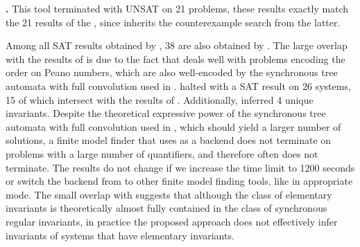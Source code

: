 \textbf{\ringenSync{}.} This tool terminated with UNSAT on 21 problems, these results exactly match the 21 results of the \ringen{\cvc{}}, since \ringenSync{} inherits the counterexample search from the latter.

Among all SAT results obtained by \eldarica{}, 38 are also obtained by \ringenSync{}.
The large overlap with the results of \eldarica{} is due to the fact that \eldarica{} deals well with problems encoding the order on Peano numbers, which are also well-encoded by the synchronous tree automata with full convolution used in \ringenSync{}. \racer{} halted with a SAT result on 26 systems, 15 of which intersect with the results of \ringenSync{}. Additionally, \ringenSync{} inferred 4 unique invariants. Despite the theoretical expressive power of the synchronous tree automata with full convolution used in \ringenSync{}, which should yield a larger number of solutions, a finite model finder that \ringenSync{} uses as a backend does not terminate on problems with a large number of quantifiers, and therefore \ringenSync{} often does not terminate.
The results do not change if we increase the time limit to 1200 seconds or switch the backend from \cvc{} to other finite model finding tools, like \vampire{} in appropriate mode. The small overlap with \racer{} suggests that although the class of elementary invariants is theoretically almost fully contained in the class of synchronous regular invariants, in practice the proposed approach does not effectively infer invariants of systems that have elementary invariants.

